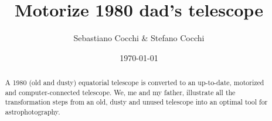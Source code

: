 \documentclass{article}
\title{Motorize 1980 dad's telescope}
\author{Sebastiano Cocchi \& Stefano Cocchi}
\date{\today}
\begin{document}
    
    \maketitle

    \begin{abstract}
        A 1980 (old and dusty) equatorial telescope is converted to an up-to-date, motorized and computer-connected telescope.
        We, me and my father, illustrate all the transformation steps from an old, dusty and unused telescope into an optimal tool for astrophotography.
    \end{abstract}

\end{document}
